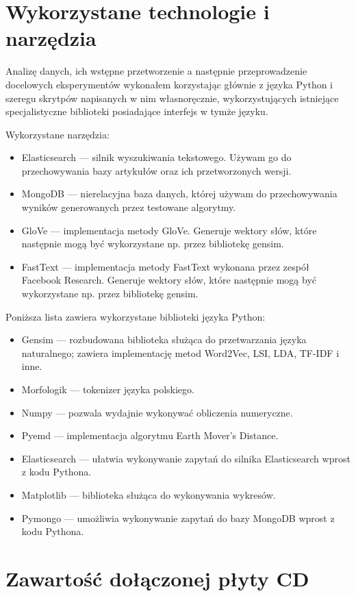\documentclass[pl]{minipw} %
\begin{document}
\newpage
\pagestyle{empty}
\appendix
\chapter{Wykorzystane technologie i narzędzia}
Analizę danych, ich wstępne przetworzenie a następnie przeprowadzenie docelowych eksperymentów wykonałem korzystając głównie z języka Python i szeregu skrytpów napisanych w nim własnoręcznie, wykorzystujących istniejące specjalistyczne biblioteki posiadające interfejs w tymże języku.

Wykorzystane narzędzia:
\begin{itemize}
	\item Elasticsearch --- silnik wyszukiwania tekstowego. Używam go do przechowywania bazy artykułów oraz ich przetworzonych wersji.
	\item MongoDB --- nierelacyjna baza danych, której używam do przechowywania wyników generowanych przez testowane algorytmy.
	\item GloVe --- implementacja metody GloVe. Generuje wektory słów, które następnie mogą być wykorzystane np. przez bibliotekę gensim.
	\item FastText --- implementacja metody FastText wykonana przez zespół Facebook Research. Generuje wektory słów, które następnie mogą być wykorzystane np. przez bibliotekę gensim.
\end{itemize}

Poniższa lista zawiera wykorzystane biblioteki języka Python:
\begin{itemize}
	\item Gensim --- rozbudowana biblioteka służąca do przetwarzania języka naturalnego; zawiera implementację metod Word2Vec, LSI, LDA, TF-IDF i inne.
	\item Morfologik --- tokenizer języka polskiego.
	\item Numpy --- pozwala wydajnie wykonywać obliczenia numeryczne.
	\item Pyemd --- implementacja algorytmu Earth Mover's Distance.
	\item Elasticsearch --- ułatwia wykonywanie zapytań do silnika Elasticsearch wprost z kodu Pythona.
	\item Matplotlib --- biblioteka służąca do wykonywania wykresów.
	\item Pymongo --- umożliwia wykonywanie zapytań do bazy MongoDB wprost z kodu Pythona.
\end{itemize}

\chapter{Zawartość dołączonej płyty CD}
\end{document}
